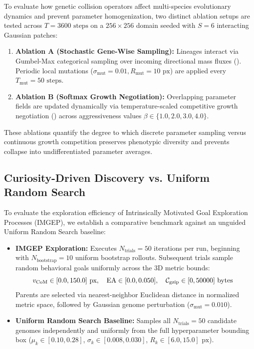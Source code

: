 To evaluate how genetic collision operators affect multi-species evolutionary dynamics and prevent parameter homogenization, two distinct ablation setups are tested across $T = 3600\text{ steps}$ on a $256 \times 256$ domain seeded with $S = 6$ interacting Gaussian patches:

\begin{enumerate}
    \item \textbf{Ablation A (Stochastic Gene-Wise Sampling):} Lineages interact via Gumbel-Max categorical sampling over incoming directional mass fluxes (). Periodic local mutations ($\sigma_{\text{mut}} = 0.01, R_{\text{mut}} = 10\text{ px}$) are applied every $T_{\text{mut}} = 50\text{ steps}$.
    \item \textbf{Ablation B (Softmax Growth Negotiation):} Overlapping parameter fields are updated dynamically via temperature-scaled competitive growth negotiation () across aggressiveness values $\beta \in \{1.0, 2.0, 3.0, 4.0\}$.
\end{enumerate}

These ablations quantify the degree to which discrete parameter sampling versus continuous growth competition preserves phenotypic diversity and prevents collapse into undifferentiated parameter averages.

\subsection{Curiosity-Driven Discovery vs. Uniform Random Search}
\label{subsec:exp_imgep_vs_random}

To evaluate the exploration efficiency of Intrinsically Motivated Goal Exploration Processes (IMGEP), we establish a comparative benchmark against an unguided Uniform Random Search baseline:

\begin{itemize}
    \item \textbf{IMGEP Exploration:} Executes $N_{\text{trials}} = 50$ iterations per run, beginning with $N_{\text{bootstrap}} = 10$ uniform bootstrap rollouts. Subsequent trials sample random behavioral goals uniformly across the 3D metric bounds:
    \begin{equation}
    v_{\text{CoM}} \in [0.0, 150.0]\text{ px}, \quad \text{EA} \in [0.0, 0.050], \quad \mathcal{C}_{\text{gzip}} \in [0, 50000]\text{ bytes}
    \label{eq:metric_bounds}
    \end{equation}
    Parents are selected via nearest-neighbor Euclidean distance in normalized metric space, followed by Gaussian genome perturbation ($\sigma_{\text{mut}} = 0.010$).
    \item \textbf{Uniform Random Search Baseline:} Samples all $N_{\text{trials}} = 50$ candidate genomes independently and uniformly from the full hyperparameter bounding box ($\mu_k \in [0.10, 0.28]$, $\sigma_k \in [0.008, 0.030]$, $R_k \in [6.0, 15.0]\text{ px}$).
\end{itemize}

